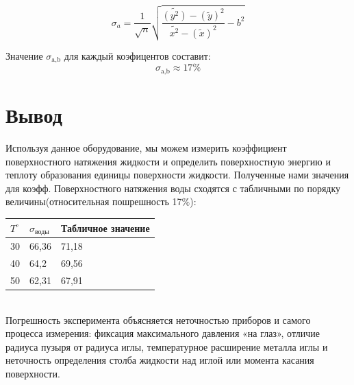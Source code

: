 \documentclass[a4paper,12pt]{article}
\theoremstyle{plain} %
\theoremstyle{definition} %
\theoremstyle{remark} %
\begin{document}
\[\sigma_a =  \dfrac{1}{\sqrt{n}}\sqrt{\dfrac{\tilde{(y^2)} - (\tilde{y})^2 }{\tilde{x^2} - (\tilde{x})^2}- b^2} \]



Значение $\sigma_\text{a,b}$ для каждый коэфицентов составит:
\[\sigma_\text{a,b} \approx 17 \% \]

\section{Вывод}\label{sec:Vivod}


Используя данное оборудование, мы можем измерить коэффициент поверхностного натяжения жидкости и определить поверхностную энергию и теплоту образования единицы поверхности жидкости.
Полученные нами значения для коэфф. Поверхностного натяжения воды сходятся с табличными по порядку величины(относительная пошрешность 17$\%$):\\

\begin{tabular}{|l|l|l|}
\hline
$T^{\circ}$ &$\sigma_\text{воды}$ & Табличное значение \\ \hline
30      & 66,36         & 71,18     \\ \hline
40      & 64,2          & 69,56     \\ \hline
50      & 62,31         & 67,91     \\ \hline
\end{tabular}\\

Погрешность эксперимента объясняется неточностью приборов и самого процесса измерения: фиксация максимального давления «на глаз», отличие радиуса пузыря от радиуса иглы, температурное расширение металла иглы и неточность определения столба жидкости над иглой или момента касания поверхности.

\end{document}
